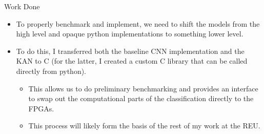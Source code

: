 \documentclass[aspectratio=169,xcolor=dvipsnames]{beamer}
\newcommand\myheading[1]{%
  \par\bigskip
  {\Large\bfseries#1}\par\smallskip}
\begin{document}
\begin{frame}{Work Done}
    \begin{itemize}
        \item To properly benchmark and implement, we need to shift the models from the high level and opaque python implementations to something lower level.
        \item To do this, I transferred both the baseline CNN implementation and the KAN to C (for the latter, I created a custom C library that can be called directly from python).
        \begin{itemize}
            \item This allows us to do preliminary benchmarking and provides an interface to swap out the computational parts of the classification directly to the FPGAs.
            \item This process will likely form the basis of the rest of my work at the REU.
        \end{itemize}
        
    \end{itemize}
\end{frame}



\end{document}
